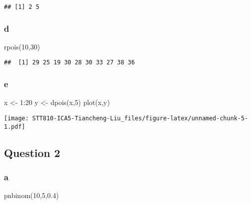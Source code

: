\documentclass[
]{article}
\newenvironment{Shaded}{\begin{snugshade}}{\end{snugshade}}
\newcommand{\DecValTok}[1]{\textcolor[rgb]{0.00,0.00,0.81}{#1}}
\newcommand{\FloatTok}[1]{\textcolor[rgb]{0.00,0.00,0.81}{#1}}
\newcommand{\FunctionTok}[1]{\textcolor[rgb]{0.00,0.00,0.00}{#1}}
\newcommand{\NormalTok}[1]{#1}
\newcommand{\OtherTok}[1]{\textcolor[rgb]{0.56,0.35,0.01}{#1}}
\newcommand{\SpecialCharTok}[1]{\textcolor[rgb]{0.00,0.00,0.00}{#1}}
\begin{document}
\begin{verbatim}
## [1] 2 5
\end{verbatim}

\hypertarget{d}{%
\subsubsection{d}\label{d}}

\begin{Shaded}
\begin{Highlighting}[]
\FunctionTok{rpois}\NormalTok{(}\DecValTok{10}\NormalTok{,}\DecValTok{30}\NormalTok{)}
\end{Highlighting}
\end{Shaded}

\begin{verbatim}
##  [1] 29 25 19 30 28 30 33 27 38 36
\end{verbatim}

\hypertarget{e}{%
\subsubsection{e}\label{e}}

\begin{Shaded}
\begin{Highlighting}[]
\NormalTok{x }\OtherTok{\textless{}{-}} \DecValTok{1}\SpecialCharTok{:}\DecValTok{20}
\NormalTok{y }\OtherTok{\textless{}{-}} \FunctionTok{dpois}\NormalTok{(x,}\DecValTok{5}\NormalTok{)}
\FunctionTok{plot}\NormalTok{(x,y)}
\end{Highlighting}
\end{Shaded}

\texttt{[image: STT810-ICA5-Tiancheng-Liu\_files/figure-latex/unnamed-chunk-5-1.pdf]}

\hypertarget{question-2}{%
\subsection{Question 2}\label{question-2}}

\hypertarget{a-1}{%
\subsubsection{a}\label{a-1}}

\begin{Shaded}
\begin{Highlighting}[]
\FunctionTok{pnbinom}\NormalTok{(}\DecValTok{10}\NormalTok{,}\DecValTok{5}\NormalTok{,}\FloatTok{0.4}\NormalTok{)}
\end{Highlighting}
\end{Shaded}
\end{document}
